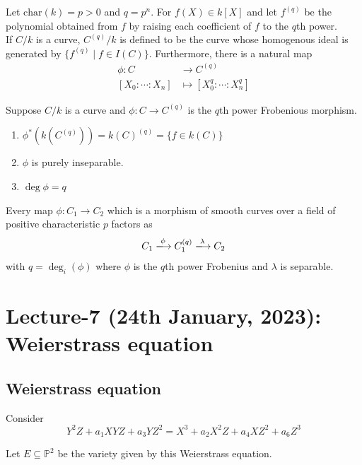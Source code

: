 \documentclass[oneside, 12pt]{scrbook}
\newcommand{\PP}{\mathbb{P}}
\theoremstyle{theorem}
\begin{document}
Let $\mathrm{char} (k)=p >0$ and $q=p^n$. For $f(X) \in k[X]$ and let $f^{(q)}$ be the polynomial obtained from $f$ by raising each coefficient of $f$ to the $q$th power. \\

If $C/k$ is a curve, $C^{(q)}/k$ is defined to be the curve whose homogenous ideal is generated by $\{f^{(q)} \mid f \in I(C)\}$. Furthermore, there is a natural map 
\begin{align*}
\phi : C &\rightarrow C^{(q)} \\
[X_{0} : \cdots : X_{n}] &\mapsto [X_{0}^{q} : \cdots : X_{n}^{q}]
\end{align*}


\begin{proposition}
Suppose $C/k$ is a curve and $\phi : C \rightarrow C^{(q)}$ is the $q$th power Frobenious morphism. 
\begin{enumerate}
\item $\phi^* (k(C^{(q)})) = k(C)^{(q)} = \{f \in k(C)\}$
\item $\phi$ is purely inseparable.
\item $\deg \phi = q$
\end{enumerate}
\end{proposition}


\begin{corollary}
Every map $\phi: C_{1} \rightarrow C_{2}$ which is a morphism of smooth curves over a field of positive characteristic $p$ factors as $$C_{1} \xlongrightarrow{\phi} C_{1}^{(q)} \xlongrightarrow{\lambda} C_{2}$$ with $q=\deg_{i}(\phi)$ where $\phi$ is the $q$th power Frobenius and $\lambda$ is separable.
\end{corollary}


\chapter{Lecture-7 (24th January, 2023): Weierstrass equation}

\section{Weierstrass equation}

Consider 
\begin{equation}
Y^2Z + a_{1}XYZ + a_{3}YZ^2 = X^3 + a_{2}X^2Z + a_{4}XZ^2 + a_{6}Z^3
\end{equation}

Let $E \subseteq \PP^2$ be the variety given by this Weierstrass equation. \\
\end{document}
